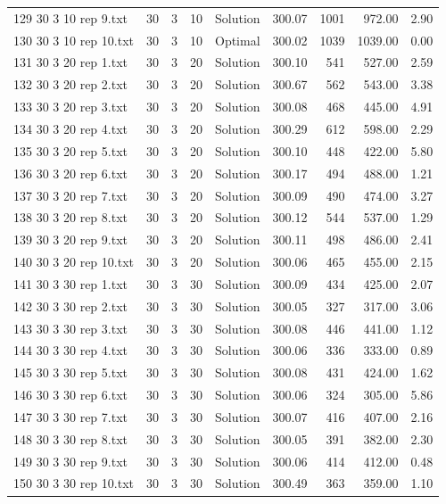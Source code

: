 \begin{longtable}{lrrllrrrr}
129 30 3 10 rep 9.txt & 30 & 3 & 10 & Solution & 300.07 & 1001 & 972.00 &  2.90\\
130 30 3 10 rep 10.txt & 30 & 3 & 10 & Optimal & 300.02 & 1039 & 1039.00 &  0.00\\
131 30 3 20 rep 1.txt & 30 & 3 & 20 & Solution & 300.10 & 541 & 527.00 &  2.59\\
132 30 3 20 rep 2.txt & 30 & 3 & 20 & Solution & 300.67 & 562 & 543.00 &  3.38\\
133 30 3 20 rep 3.txt & 30 & 3 & 20 & Solution & 300.08 & 468 & 445.00 &  4.91\\
134 30 3 20 rep 4.txt & 30 & 3 & 20 & Solution & 300.29 & 612 & 598.00 &  2.29\\
135 30 3 20 rep 5.txt & 30 & 3 & 20 & Solution & 300.10 & 448 & 422.00 &  5.80\\
136 30 3 20 rep 6.txt & 30 & 3 & 20 & Solution & 300.17 & 494 & 488.00 &  1.21\\
137 30 3 20 rep 7.txt & 30 & 3 & 20 & Solution & 300.09 & 490 & 474.00 &  3.27\\
138 30 3 20 rep 8.txt & 30 & 3 & 20 & Solution & 300.12 & 544 & 537.00 &  1.29\\
139 30 3 20 rep 9.txt & 30 & 3 & 20 & Solution & 300.11 & 498 & 486.00 &  2.41\\
140 30 3 20 rep 10.txt & 30 & 3 & 20 & Solution & 300.06 & 465 & 455.00 &  2.15\\
141 30 3 30 rep 1.txt & 30 & 3 & 30 & Solution & 300.09 & 434 & 425.00 &  2.07\\
142 30 3 30 rep 2.txt & 30 & 3 & 30 & Solution & 300.05 & 327 & 317.00 &  3.06\\
143 30 3 30 rep 3.txt & 30 & 3 & 30 & Solution & 300.08 & 446 & 441.00 &  1.12\\
144 30 3 30 rep 4.txt & 30 & 3 & 30 & Solution & 300.06 & 336 & 333.00 &  0.89\\
145 30 3 30 rep 5.txt & 30 & 3 & 30 & Solution & 300.08 & 431 & 424.00 &  1.62\\
146 30 3 30 rep 6.txt & 30 & 3 & 30 & Solution & 300.06 & 324 & 305.00 &  5.86\\
147 30 3 30 rep 7.txt & 30 & 3 & 30 & Solution & 300.07 & 416 & 407.00 &  2.16\\
148 30 3 30 rep 8.txt & 30 & 3 & 30 & Solution & 300.05 & 391 & 382.00 &  2.30\\
149 30 3 30 rep 9.txt & 30 & 3 & 30 & Solution & 300.06 & 414 & 412.00 &  0.48\\
150 30 3 30 rep 10.txt & 30 & 3 & 30 & Solution & 300.49 & 363 & 359.00 &  1.10\\

\end{longtable}
